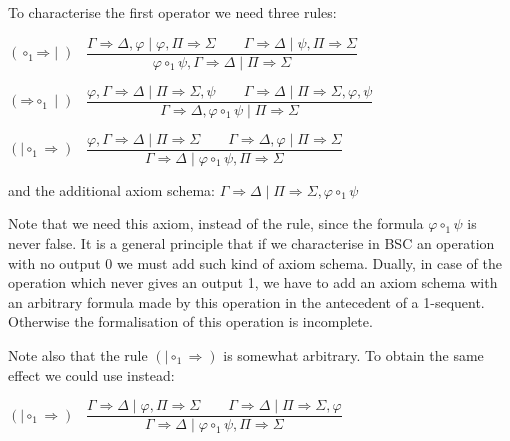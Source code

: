 \documentclass[11pt,a4paper,titlepage]{article}
\theoremstyle{definition}
\newcommand{\3}{\vspace{.3in}}
\newcommand{\2}{\vspace{.2in}}
\newcommand{\1}{\vspace{.1in}}
\newcommand{\5}{\vspace{.05in}}
\begin{document}
To characterise the first operator we need three rules:

\begin{flushleft}
	$(\mathord{\circ_1}\mathord{\Rightarrow}\mid)$ \, $\dfrac{\Gamma
		\Rightarrow \Delta, \varphi \mid \varphi, \Pi\Rightarrow\Sigma \qquad \Gamma\Rightarrow\Delta \mid\psi,
		\Pi \Rightarrow \Sigma } {\varphi\circ_1\psi, \Gamma
		\Rightarrow \Delta \mid \Pi\Rightarrow\Sigma}$
\end{flushleft} 

\begin{flushleft}
	$(\mathord{\Rightarrow}\mathord{\circ_1}\mid)$ \, $\dfrac{\varphi, \Gamma
		\Rightarrow \Delta \mid \Pi\Rightarrow\Sigma, \psi \qquad\Gamma\Rightarrow\Delta \mid\Pi \Rightarrow \Sigma, \varphi, \psi} {\Gamma
		\Rightarrow \Delta, \varphi\circ_1\psi \mid \Pi\Rightarrow\Sigma}$
\end{flushleft} 

\begin{flushleft}
	$(\mathord{\mid\mathord{\circ_1}\Rightarrow})$ \, $\dfrac{\varphi, \Gamma
		\Rightarrow \Delta \mid \Pi\Rightarrow\Sigma \qquad\Gamma\Rightarrow\Delta, \varphi \mid\Pi \Rightarrow \Sigma} {\Gamma
		\Rightarrow \Delta\mid \varphi\circ_1\psi, \Pi\Rightarrow\Sigma}$
\end{flushleft} 


and the additional axiom schema: $\Gamma\Rightarrow\Delta\mid\Pi\Rightarrow\Sigma, \varphi\circ_1\psi$

\1

Note that we need this axiom, instead of the rule, since the formula $\varphi\circ_1\psi$ is never false. It is a general principle that if we characterise in BSC an operation with no output 0 we must add such kind of axiom schema. Dually, in case of the operation which never gives an output 1, we have to add an axiom schema with an arbitrary formula made by this operation in the antecedent of a 1-sequent.  Otherwise the formalisation of this operation is incomplete.

Note also that the rule $(\mathord{\mid\mathord{\circ_1}\Rightarrow})$ is somewhat arbitrary. To obtain the same effect we could use instead:

\begin{flushleft}
	$(\mathord{\mid\mathord{\circ_1}\Rightarrow})$ \, $\dfrac{\Gamma
		\Rightarrow \Delta \mid \varphi, \Pi\Rightarrow\Sigma \qquad\Gamma\Rightarrow\Delta\mid\Pi \Rightarrow \Sigma, \varphi} {\Gamma
		\Rightarrow \Delta\mid \varphi\circ_1\psi, \Pi\Rightarrow\Sigma}$
\end{flushleft} 
\end{document}
